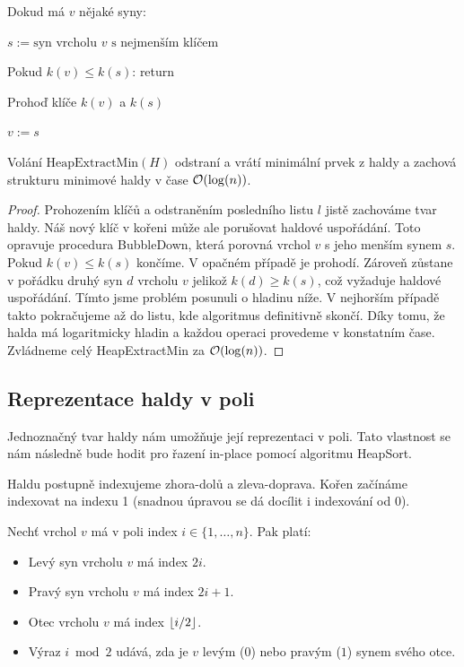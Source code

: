 \begin{pseudocode}
\item Dokud má $v$ nějaké syny:
\item \tab $s := \text{syn vrcholu } v \text{ s nejmenším klíčem}$
\item \tab Pokud $k(v) \le k(s)$: return
\item \tab Prohoď klíče $k(v)$ a $k(s)$
\item \tab $v := s$
\end{pseudocode} \bigskip

\begin{lemma}
Volání $\text{HeapExtractMin}(H)$ odstraní a vrátí minimální prvek z haldy a zachová strukturu minimové haldy v čase $\mathcal{O}(\log(n))$.
\end{lemma} \bigskip

\begin{proof}
Prohozením klíčů a odstraněním posledního listu $l$ jistě zachováme tvar haldy. Náš nový klíč v kořeni může ale porušovat haldové uspořádání. Toto opravuje procedura BubbleDown, která porovná vrchol $v$ s jeho menším synem $s$. Pokud $k(v) \leq k(s)$ končíme. V opačném případě je prohodí. Zároveň zůstane v pořádku druhý syn $d$ vrcholu $v$ jelikož $k(d) \geq k(s)$, což vyžaduje haldové uspořádání. Tímto jsme problém posunuli o hladinu níže. V nejhorším případě takto pokračujeme až do listu, kde algoritmus definitivně skončí. Díky tomu, že halda má logaritmicky hladin a každou operaci provedeme v konstatním čase. Zvládneme celý HeapExtractMin za $\mathcal{O}(\log(n))$.
\end{proof}

\newpage

\subsection{Reprezentace haldy v poli}

Jednoznačný tvar haldy nám umožňuje její reprezentaci v poli. Tato vlastnost se nám následně bude hodit pro řazení in-place pomocí algoritmu HeapSort. \bigskip

\noindent Haldu postupně indexujeme zhora-dolů a zleva-doprava. Kořen začínáme indexovat na indexu 1 (snadnou úpravou se dá docílit i indexování od 0).

\begin{remark} 
Nechť vrchol $v$ má v poli index $i \in \{1, \dots, n\}$. Pak platí:
\begin{itemize}
    \item Levý syn vrcholu $v$ má index $2i$.
    \item Pravý syn vrcholu $v$ má index $2i + 1$.
    \item Otec vrcholu $v$ má index $\left\lfloor i / 2\right\rfloor$.
    \item Výraz $i \bmod 2$ udává, zda je $v$ levým ($0$) nebo pravým ($1$) synem svého otce.
\end{itemize}
\end{remark}


